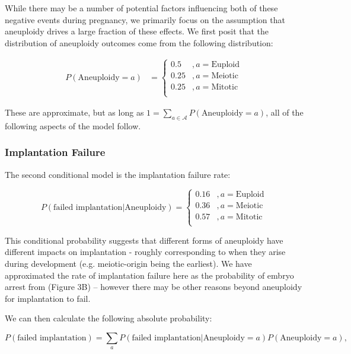 \documentclass{article}
\begin{document}
While there may be a number of potential factors influencing both of these negative events during pregnancy, we primarily focus on the assumption that aneuploidy drives a large fraction of these effects. We first posit that the distribution of aneuploidy outcomes come from the following distribution: 

\begin{equation}
\begin{aligned}
P(\text{Aneuploidy} = a) &= \begin{cases}
0.5 &, a = \text{Euploid}\\
0.25 &, a = \text{Meiotic}\\
0.25 &, a = \text{Mitotic}\\
\end{cases}
\end{aligned}
\end{equation}

These are approximate, but as long as $1 = \sum_{a \in \mathcal{A}} P(\text{Aneuploidy} = a)$, all of the following aspects of the model follow. 

\subsubsection*{Implantation Failure}

The second conditional model is the implantation failure rate: 

\begin{equation}
P(\text{failed implantation} | \text{Aneuploidy}) = \begin{cases}
0.16 &, a = \text{Euploid}\\
0.36 &, a = \text{Meiotic}\\
0.57 &, a = \text{Mitotic}\\
\end{cases}
\end{equation}

This conditional probability suggests that different forms of aneuploidy have different impacts on implantation - roughly corresponding to when they arise during development (e.g. meiotic-origin being the earliest). We have approximated the rate of implantation failure here as the probability of embryo arrest from \citep{McCoy2023-dg} (Figure 3B) -- however there may be other reasons beyond aneuploidy for implantation to fail.  

We can then calculate the following absolute probability:

\begin{equation}
P(\text{failed implantation}) = \sum_{a} P(\text{failed implantation} | \text{Aneuploidy} = a) P(\text{Aneuploidy} = a) ,
\end{equation}
\end{document}
